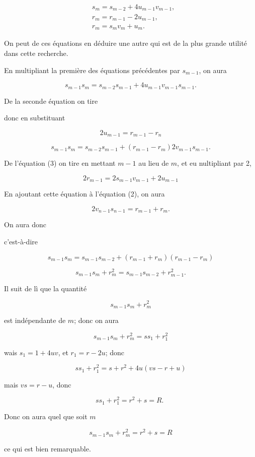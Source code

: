 \documentclass{article}
\begin{document}
\[
\begin{aligned}
& s_{m}=s_{m-2}+4 u_{m-1} v_{m-1}, \\
& r_{m}=r_{m-1}-2 u_{m-1}, \\
& r_{m}=s_{m} v_{m}+u_{m} .
\end{aligned}
\]

On peut de ces équations en déduire une autre qui est de la plus grande utilité dans cette recherche.

En multipliant la première des équations précédentes par \(s_{m-1}\), on aura

\[
s_{m-1} s_{m}=s_{m-2} s_{m-1}+4 u_{m-1} v_{m-1} s_{m-1} .
\]

De la seconde équation on tire

donc en substituant

\[
2 u_{m-1}=r_{m-1}-r_{n}
\]

\[
s_{m-1} s_{m}=s_{m-2} s_{m-1}+\left(r_{m-1}-r_{m}\right) 2 v_{m-1} s_{m-1} .
\]

De l'équation (3) on tire en mettant \(m-1\) au lieu de \(m\), et eu nultipliant par 2,

\[
2 r_{m-1}=2 s_{m-1} v_{m-1}+2 u_{m-1}
\]

En ajoutant cette équation à l'équation (2), on aura

\[
2 v_{n-1} s_{n-1}=r_{m-1}+r_{m} .
\]

On aura donc

c'est-à-dire

\[
s_{m-1} s_{m}=s_{m-1} s_{m-2}+\left(r_{m-1}+r_{m}\right)\left(r_{m-1}-r_{m}\right)
\]

\[
s_{m-1} s_{m}+r_{m}^{2}=s_{m-1} s_{m-2}+r_{m-1}^{2} .
\]

Il suit de lì que la quantité

\[
s_{m-1} s_{m}+r_{m}^{2}
\]

est indépendante de \(m\); donc on aura

\[
s_{m-1} s_{m}+r_{m}^{2}=s s_{1}+r_{1}^{2}
\]

wais \(s_{1}=1+4 u v\), et \(r_{1}=r-2 u\); donc

\[
s s_{1}+r_{1}^{2}=s+r^{2}+4 u(v s-r+u)
\]

mais \(v s=r-u\), donc

\[
s s_{1}+r_{1}^{2}=r^{2}+s=R \text {. }
\]

Donc on aura quel que soit \(m\)

\[
s_{m-1} s_{m}+r_{m}^{2}=r^{2}+s=R
\]

ce qui est bien remarquable.
\end{document}
